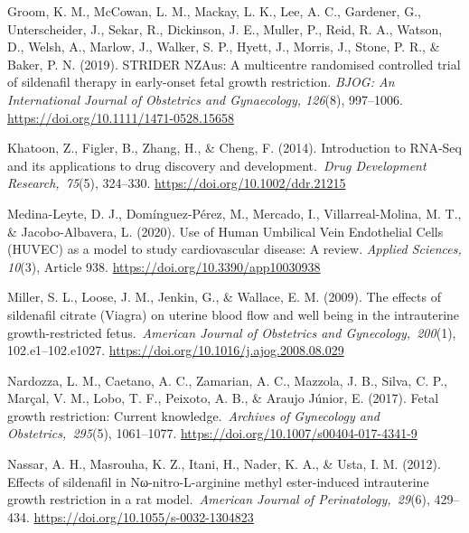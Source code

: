 \documentclass[authordate, reflection,issue]{jote-new-article}
\begin{document}
	Groom, K. M., McCowan, L. M., Mackay, L. K., Lee, A. C., Gardener, G., Unterscheider, J., Sekar, R., Dickinson, J. E., Muller, P., Reid, R. A., Watson, D., Welsh, A., Marlow, J., Walker, S. P., Hyett, J., Morris, J., Stone, P. R., \& Baker, P. N. (2019). STRIDER NZAus: A multicentre randomised controlled trial of sildenafil therapy in early-onset fetal growth restriction. \emph{BJOG: An International Journal of Obstetrics and Gynaecology, 126}(8), 997--1006. \url{https://doi.org/10.1111/1471-0528.15658}







	Khatoon, Z., Figler, B., Zhang, H., \& Cheng, F. (2014). Introduction to RNA-Seq and its applications to drug discovery and development. \emph{Drug Development Research, 75}(5), 324--330. \url{https://doi.org/10.1002/ddr.21215}







	Medina-Leyte, D. J., Domínguez-Pérez, M., Mercado, I., Villarreal-Molina, M. T., \& Jacobo-Albavera, L. (2020). Use of Human Umbilical Vein Endothelial Cells (HUVEC) as a model to study cardiovascular disease: A review. \emph{Applied Sciences,} \emph{10}(3), Article 938. \url{https://doi.org/10.3390/app10030938}







	Miller, S. L., Loose, J. M., Jenkin, G., \& Wallace, E. M. (2009). The effects of sildenafil citrate (Viagra) on uterine blood flow and well being in the intrauterine growth-restricted fetus. \emph{American Journal of Obstetrics and Gynecology, 200}(1), 102.e1--102.e1027. \url{https://doi.org/10.1016/j.ajog.2008.08.029}







	Nardozza, L. M., Caetano, A. C., Zamarian, A. C., Mazzola, J. B., Silva, C. P., Marçal, V. M., Lobo, T. F., Peixoto, A. B., \& Araujo Júnior, E. (2017). Fetal growth restriction: Current knowledge. \emph{Archives of Gynecology and Obstetrics, 295}(5), 1061--1077. \url{https://doi.org/10.1007/s00404-017-4341-9}



	Nassar, A. H., Masrouha, K. Z., Itani, H., Nader, K. A., \& Usta, I. M. (2012). Effects of sildenafil in Nω-nitro-L-arginine methyl ester-induced intrauterine growth restriction in a rat model. \emph{American Journal of Perinatology, 29}(6), 429--434. \url{https://doi.org/10.1055/s-0032-1304823}
\end{document}
